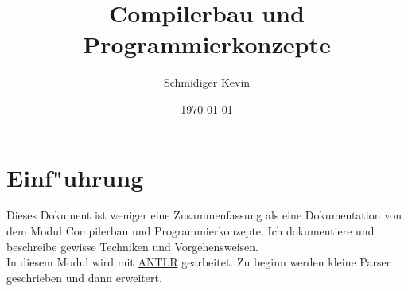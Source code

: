\documentclass[11pt, oneside]{article}   	%
\title{Compilerbau und Programmierkonzepte}
\author{Schmidiger Kevin}
\date{\today}						%
\begin{document}
\maketitle
\newpage

\tableofcontents
\newpage

\section{Einf"uhrung}
Dieses Dokument ist weniger eine Zusammenfassung als eine Dokumentation von dem Modul Compilerbau und Programmierkonzepte. Ich dokumentiere und beschreibe gewisse Techniken und Vorgehensweisen.\\
In diesem Modul wird mit \hyperref[http://www.antlr.org/]{ANTLR} gearbeitet. Zu beginn werden kleine Parser geschrieben und dann erweitert.
\end{document}
